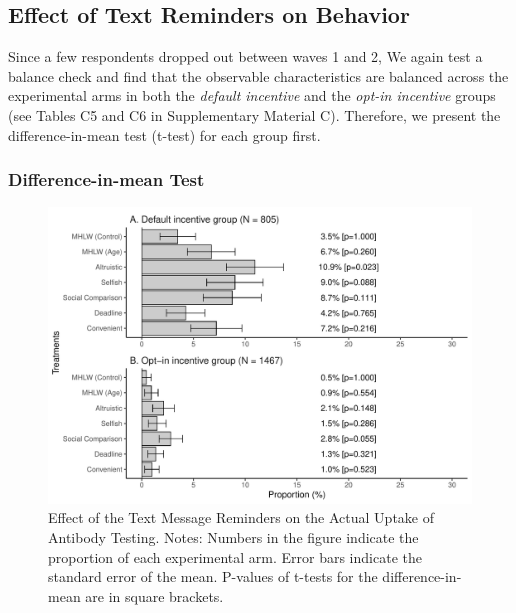\documentclass[
      12pt,
    a4paper
]{article}
\begin{document}
\hypertarget{behavior}{%
\subsection{Effect of Text Reminders on Behavior}\label{behavior}}

Since a few respondents dropped out between waves 1 and 2, We again test a balance check and find that the observable characteristics are balanced across the experimental arms in both the \emph{default incentive} and the \emph{opt-in incentive} groups (see Tables C5 and C6 in Supplementary Material C). Therefore, we present the difference-in-mean test (t-test) for each group first.

\hypertarget{difference-in-mean-test-1}{%
\subsubsection{Difference-in-mean Test}\label{difference-in-mean-test-1}}

\begin{figure}[t]
\includegraphics{Main-Document-LaTeX_files/figure-latex/ttest-act-test-1} \caption{Effect of the Text Message Reminders on the Actual Uptake of Antibody Testing. Notes: Numbers in the figure indicate the proportion of each experimental arm. Error bars indicate the standard error of the mean. P-values of t-tests for the difference-in-mean are in square brackets.}\label{fig:ttest-act-test}
\end{figure}
\end{document}
